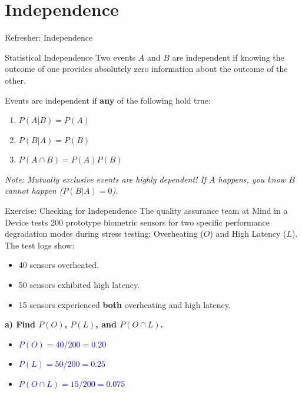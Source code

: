 \documentclass[aspectratio=169]{beamer}
\begin{document}
\section{Independence}

\begin{frame}{Refresher: Independence}
    \begin{block}{Statistical Independence}
        Two events $A$ and $B$ are independent if knowing the outcome of one provides absolutely zero information about the outcome of the other. 
    \end{block}
    
    \vspace{0.2cm}
    Events are independent if \textbf{any} of the following hold true:
    \begin{enumerate}
        \item $P(A|B) = P(A)$
        \item $P(B|A) = P(B)$
        \item $P(A \cap B) = P(A)P(B)$
    \end{enumerate}
    
    \vspace{0.2cm}
    \textit{Note: Mutually exclusive events are highly dependent! If $A$ happens, you know $B$ cannot happen ($P(B|A)=0$).}
\end{frame}

\begin{frame}{Exercise: Checking for Independence}
    \small
    The quality assurance team at Mind in a Device tests 200 prototype biometric sensors for two specific performance degradation modes during stress testing: Overheating ($O$) and High Latency ($L$). The test logs show:
    \begin{itemize}
        \item 40 sensors overheated.
        \item 50 sensors exhibited high latency.
        \item 15 sensors experienced \textbf{both} overheating and high latency.
    \end{itemize}
    
    \textbf{a) Find $P(O)$, $P(L)$, and $P(O \cap L)$.} \pause
    \begin{itemize}
        \item \textcolor{blue}{$P(O) = 40/200 = 0.20$}
        \item \textcolor{blue}{$P(L) = 50/200 = 0.25$}
        \item \textcolor{blue}{$P(O \cap L) = 15/200 = 0.075$}
    \end{itemize}
\end{frame}
\end{document}
